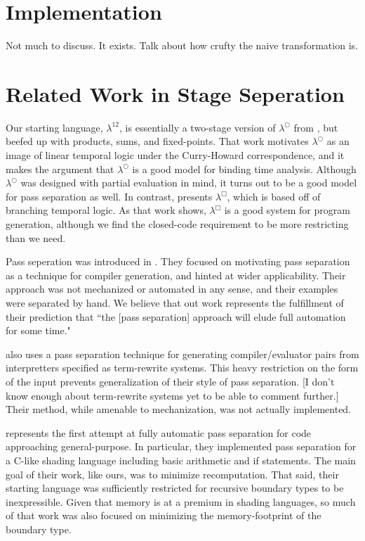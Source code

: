 \documentclass{article}
\begin{document}
\section {Implementation}

Not much to discuss.  It exists.  Talk about how crufty the naive transformation is.

\section{Related Work in Stage Seperation}

Our starting language, $\lambda^{12}$, is essentially a two-stage version of $\lambda^\bigcirc$ from \cite{davies96}, but beefed up with products, sums, and fixed-points.  That work motivates $\lambda^\bigcirc$ as an image of linear temporal logic under the Curry-Howard correspondence, and it makes the argument that $\lambda^\bigcirc$ is a good model for binding time analysis.  Although $\lambda^\bigcirc$ was designed with partial evaluation in mind, it turns out to be a good model for pass separation as well.  In contrast, \cite{davies01} presents $\lambda^\Box$, which is based off of branching temporal logic.  As that work shows, $\lambda^\Box$ is a good system for program generation, although we find the closed-code requirement to be more restricting than we need.

Pass seperation was introduced in \cite{jorring}.  They focused on motivating pass separation as a technique for compiler generation, and hinted at wider applicability.  Their approach was not mechanized or automated in any sense, and their examples were separated by hand.  We believe that out work represents the fulfillment of their prediction that ``the [pass separation] approach will elude full automation for some time."

\cite{hannan94} also uses a pass separation technique for generating compiler/evaluator pairs from interpretters specified as term-rewrite systems.  This heavy restriction on the form of the input prevents generalization of their style of pass separation.  [I don't know enough about term-rewrite systems yet to be able to comment further.]  Their method, while amenable to mechanization, was not actually implemented.

\cite{knoblock} represents the first attempt at fully automatic pass separation for code approaching general-purpose.  In particular, they implemented pass separation for a C-like shading language including basic arithmetic and if statements.  The main goal of their work, like ours, was to minimize recomputation. That said, their starting language was sufficiently restricted for recursive boundary types to be inexpressible.  Given that memory is at a premium in shading languages, so much of that work was also focused on minimizing the memory-footprint of the boundary type.



\end{document}
